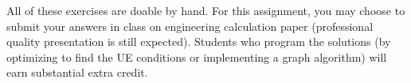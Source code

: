 All of these exercises are doable by hand. For this assignment, you may choose
to submit your answers in class on engineering calculation paper (professional
quality presentation is still expected). Students who program the solutions
(by optimizing to find the UE conditions or implementing a graph algorithm) will earn
substantial extra credit.
